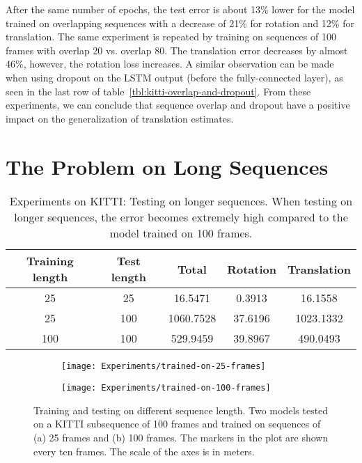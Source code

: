 		After the same number of epochs, the test error is about 13\% lower for the model trained on overlapping sequences with a decrease of 21\% for rotation and 12\% for translation.
		The same experiment is repeated by training on sequences of 100 frames with overlap 20 vs. overlap 80. 
		The translation error decreases by almost 46\%, however, the rotation loss increases.
		A similar observation can be made when using dropout on the LSTM output (before the fully-connected layer), as seen in the last row of table~\ref{tbl:kitti-overlap-and-dropout}.
		From these experiments, we can conclude that sequence overlap and dropout have a positive impact on the generalization of translation estimates.
		
		
	
	\section{The Problem on Long Sequences}
	
	
		\begin{table}[tb]
			\small
			\begin{center}
				\begin{tabular}{|c|c||c|c|c|}
					\hline
					Training length & Test length 	& Total 	& Rotation	& Translation	\\ \hline
					25				& 25			& 16.5471	& 0.3913	& 16.1558		\\ \hline
					25				& 100			& 1060.7528	& 37.6196	& 1023.1332		\\ \hline
					100				& 100			& 529.9459	& 39.8967	& 490.0493		\\ \hline
				\end{tabular}
			\end{center}
			\caption[Experiments on KITTI: Testing on longer sequences]
					{Experiments on KITTI: Testing on longer sequences. 
				 When testing on longer sequences, the error becomes extremely high compared to the model trained on 100 frames.
				 \label{tbl:kitti-testing-on-longer-sequences}}
		\end{table}

		\begin{figure}
			\centering
			\begin{subfigure}[b]{0.5\linewidth}
				\centering
				\texttt{[image: Experiments/trained-on-25-frames]}
				\caption{
					\label{fig:0}
				}
			\end{subfigure}%
			\begin{subfigure}[b]{0.5\linewidth}
				\centering
				\texttt{[image: Experiments/trained-on-100-frames]}
				\caption{
					\label{fig:1}
				}
			\end{subfigure}%
			\caption[Training and testing on different sequence length]
					{Training and testing on different sequence length. 
				 Two models tested on a KITTI subsequence of 100 frames and trained on sequences of (a) 25 frames and (b) 100 frames. 
				 The markers in the plot are shown every ten frames.
				 The scale of the axes is in meters.
				 \label{fig:kitti-testing-on-longer-sequences}}
		\end{figure}


